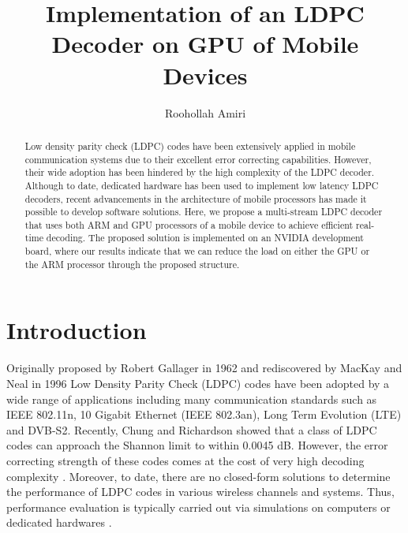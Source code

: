 \documentclass{article}
\begin{document}
\title{Implementation of an LDPC Decoder on GPU of Mobile Devices}
\author{Roohollah Amiri}
\maketitle

\begin{abstract}

Low density parity check (LDPC) codes have been extensively applied in mobile communication systems due to their excellent error correcting capabilities. However, their wide adoption has been hindered by the high complexity of the LDPC decoder. Although to date, dedicated hardware has been used to implement low latency LDPC decoders, recent advancements in the architecture of mobile processors has made it possible to develop software solutions. Here, we propose a multi-stream LDPC decoder that uses both ARM and GPU processors of a mobile device to achieve efficient real-time decoding. The proposed solution is implemented on an NVIDIA development board, where our results indicate that we can reduce the load on either the GPU or the ARM processor through the proposed structure.

\end{abstract}


\section{Introduction}
Originally proposed by Robert Gallager in 1962 \cite{art_gallager} and rediscovered by MacKay and Neal in 1996 \cite{art_macKay} Low Density Parity Check (LDPC) codes have been adopted by a wide range of applications including many communication standards such as IEEE 802.11n, 10 Gigabit Ethernet (IEEE 802.3an), Long Term Evolution (LTE) and DVB-S2. Recently, Chung and Richardson \cite{art_shannon} showed that a class of LDPC codes can approach the Shannon limit to within 0.0045 dB. However, the error correcting strength of these codes comes at the cost of very high decoding complexity \cite{art_ldpc_cpu1}. Moreover, to date, there are no closed-form solutions to determine the performance of LDPC codes in various wireless channels and systems. Thus, performance evaluation is typically carried out via simulations on computers or dedicated hardwares \cite{art_memory_coalesced}.
\end{document}
